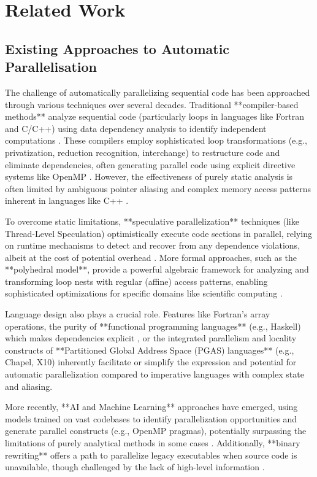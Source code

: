 \section{Related Work}

\subsection{Existing Approaches to Automatic Parallelisation}
The challenge of automatically parallelizing sequential code has been approached through various techniques over several decades. Traditional **compiler-based methods** analyze sequential code (particularly loops in languages like Fortran and C/C++) using data dependency analysis to identify independent computations \cite{KennedyAllen2001OptimizingCompilers}. These compilers employ sophisticated loop transformations (e.g., privatization, reduction recognition, interchange) to restructure code and eliminate dependencies, often generating parallel code using explicit directive systems like OpenMP \cite{OpenMPARBP2018OpenMPSpecification}. However, the effectiveness of purely static analysis is often limited by ambiguous pointer aliasing and complex memory access patterns inherent in languages like C++ \cite{Allen1983DependenceAnalysis}.

To overcome static limitations, **speculative parallelization** techniques (like Thread-Level Speculation) optimistically execute code sections in parallel, relying on runtime mechanisms to detect and recover from any dependence violations, albeit at the cost of potential overhead \cite{Rauchwerger1995RunTime}. More formal approaches, such as the **polyhedral model**, provide a powerful algebraic framework for analyzing and transforming loop nests with regular (affine) access patterns, enabling sophisticated optimizations for specific domains like scientific computing \cite{Bondhugula2008AutomaticDistributedMemory}.

Language design also plays a crucial role. Features like Fortran's array operations, the purity of **functional programming languages** (e.g., Haskell) which makes dependencies explicit \cite{Hammond1996ParallelFunctional}, or the integrated parallelism and locality constructs of **Partitioned Global Address Space (PGAS) languages** (e.g., Chapel, X10) \cite{Yelick2007ProductivityParallel} inherently facilitate or simplify the expression and potential for automatic parallelization compared to imperative languages with complex state and aliasing.

More recently, **AI and Machine Learning** approaches have emerged, using models trained on vast codebases to identify parallelization opportunities and generate parallel constructs (e.g., OpenMP pragmas), potentially surpassing the limitations of purely analytical methods in some cases \cite{OMPar}. Additionally, **binary rewriting** offers a path to parallelize legacy executables when source code is unavailable, though challenged by the lack of high-level information \cite{Amaral2006AutomaticBinary}.

